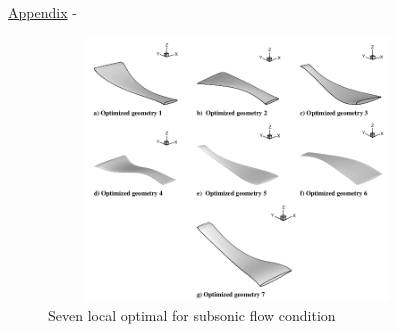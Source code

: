 \begin{frame}[allowframebreaks]{\underline{Appendix} -}
\begin{figure}
    \centering
    \includegraphics[width = 100mm, height = 70mm]{figures/optimal_wing.png}
    \caption{Seven local optimal for subsonic flow condition}
    \label{optimal seven}
\end{figure}
\end{frame}